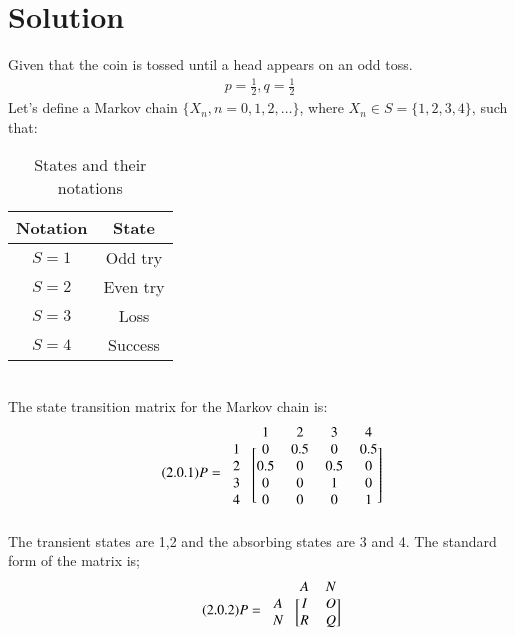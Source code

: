 \documentclass[journal,12pt,twocolumn]{IEEEtran}
\begin{document}
\section{Solution}
Given that the coin is tossed until a head appears on an odd toss.\\
\begin{align}
    p = \frac{1}{2}, q = \frac{1}{2}
\end{align}
 Let's define a Markov chain $\{X_{n},n=0,1,2,\dots\}$, where $X_{n}\in S=\{1,2,3,4\}$, such that:
\begin{table}[h!]
\centering
\caption{States and their notations}
\label{table:1}
\begin{tabular}{|c|c|}
    \hline
    Notation & State \\
    \hline
    $S=1$ & Odd try\\[1ex]
    \hline
    $S=2$ & Even try\\[1ex]
    \hline
    $S=3$ & Loss\\[1ex]
    \hline
    $S=4$ & Success\\[1ex]
    \hline
\end{tabular}
\end{table}
\\The state transition matrix for the Markov chain is:
\begin{align}
\tag{2.0.1}
\label{eq:2.0.1}
    P=\begin{blockarray}{ccccc}
    &1 &2 &3 &4\\
    \begin{block}{c[cccc]}
1 & 0 & 0.5 & 0 & 0.5\\
2 & 0.5 & 0 & 0.5 & 0\\
3 & 0 & 0 & 1 & 0\\
4 & 0 & 0 & 0 & 1\\
\end{block}
\end{blockarray}
\end{align}
The transient states are 1,2 and the absorbing states are 3 and 4. The standard form of the matrix is;
\begin{align}
\tag{2.0.2}
\label{eq:2.0.2}
    P=\begin{blockarray}{ccc}
&A & N \\
\begin{block}{c[cc]}
  A & I & O  \\
  N & R & Q \\
\end{block}
\end{blockarray}
\end{align}
\end{document}
